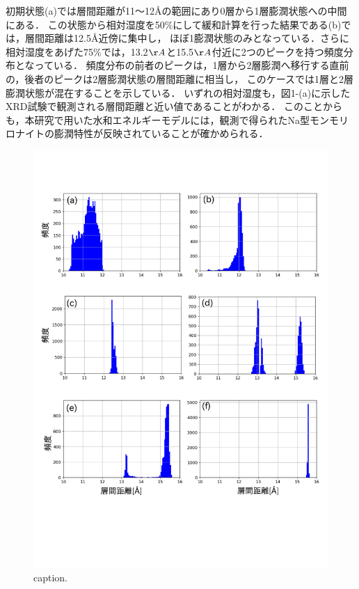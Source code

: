 初期状態(a)では層間距離が11〜12Åの範囲にあり0層から1層膨潤状態への中間にある．
この状態から相対湿度を50$\%$にして緩和計算を行った結果である(b)では，層間距離は12.5Å近傍に集中し，
ほぼ1膨潤状態のみとなっている．さらに相対湿度をあげた75$\%$では，13.2$\AA$と15.5$\AA$付近に2つのピークを持つ頻度分布となっている．
頻度分布の前者のピークは，1層から2層膨潤へ移行する直前の，後者のピークは2層膨潤状態の層間距離に相当し，
このケースでは1層と2層膨潤状態が混在することを示している．
いずれの相対湿度も，図1-(a)に示したXRD試験で観測される層間距離と近い値であることがわかる．
このことからも，本研究で用いた水和エネルギーモデルには，観測で得られたNa型モンモリロナイトの膨潤特性が反映されていることが確かめられる．
\begin{figure}[h]
	\begin{center}
	\includegraphics[width=1.0\linewidth]{Figs/fig5.pdf} 
	\end{center}
	\caption{
		caption.
	} 
	\label{fig:fig5}
\end{figure}
